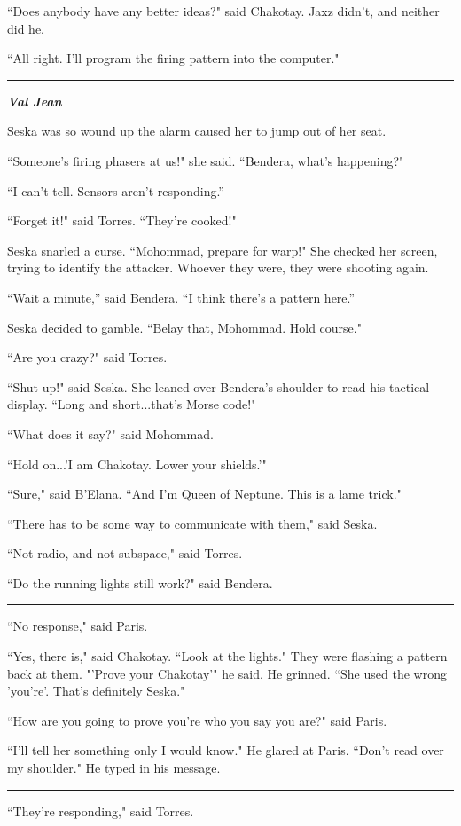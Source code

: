 \documentclass[twoside,letterpaper,12pt]{memoir}
\begin{document}
``Does anybody have any better ideas?" said Chakotay. Jaxz didn't, and neither did he.

``All right. I'll program the firing pattern into the computer."

\fancybreak{\rule{3cm}{0.4 pt}}
\textit{\textbf{Val Jean}}

Seska was so wound up the alarm caused her to jump out of her seat.

``Someone's firing phasers at us!" she said. ``Bendera, what’s happening?"

``I can’t tell. Sensors aren’t responding.”

``Forget it!" said Torres. ``They're cooked!"

Seska snarled a curse. ``Mohommad, prepare for warp!" She checked her screen, trying to identify the attacker. Whoever they were, they were shooting again.

``Wait a minute,” said Bendera. ``I think there’s a pattern here.”

Seska decided to gamble. ``Belay that, Mohommad. Hold course."

``Are you crazy?" said Torres.

``Shut up!" said Seska. She leaned over Bendera’s shoulder to read his tactical display. ``Long and short...that's Morse code!"

``What does it say?" said Mohommad.

``Hold on...'I am Chakotay. Lower your shields.'"

``Sure," said B'Elana. ``And I'm Queen of Neptune. This is a lame trick."

``There has to be some way to communicate with them," said Seska.

``Not radio, and not subspace," said Torres.

``Do the running lights still work?" said Bendera.

\fancybreak{\rule{3cm}{0.4 pt}}
``No response," said Paris.

``Yes, there is," said Chakotay. ``Look at the lights." They were flashing a pattern back at them. "'Prove your Chakotay'" he said. He grinned. ``She used the wrong 'you're'. That's definitely Seska."

``How are you going to prove you're who you say you are?" said Paris.

``I'll tell her something only I would know." He glared at Paris. ``Don't read over my shoulder." He typed in his message.

\fancybreak{\rule{3cm}{0.4 pt}}
``They're responding," said Torres.
\end{document}
